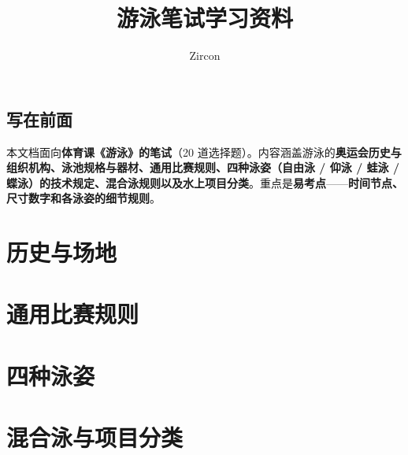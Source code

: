 \documentclass[oneside]{book}
\def\notetitle{游泳笔试学习资料}
\def\noteauthor{Zircon}
\def\notedate{}
\begin{document}
\title{\heiti \LARGE \notetitle \vspace*{8\baselineskip}}
\author{\noteauthor}
\date{\notedate}

\maketitle
\newpage

\chapter*{写在前面}

本文档面向\textbf{体育课《游泳》的笔试}（20 道选择题）。内容涵盖游泳的\textbf{奥运会历史与组织机构、泳池规格与器材、通用比赛规则、四种泳姿（自由泳 / 仰泳 / 蛙泳 / 蝶泳）的技术规定、混合泳规则以及水上项目分类}。重点是\textbf{易考点}——\textbf{时间节点、尺寸数字和各泳姿的细节规则}。

\setcounter{tocdepth}{1}
\tableofcontents
\newpage

\part{历史与场地}



\part{通用比赛规则}


\part{四种泳姿}





\part{混合泳与项目分类}

\end{document}
